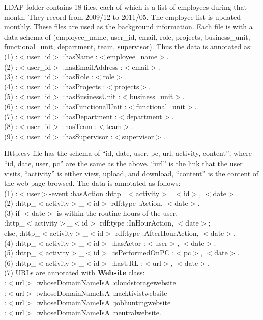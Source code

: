 LDAP folder contains 18 files, each of which is a list of employees during that month.
They record from 2009/12 to 2011/05.
The employee list is updated monthly.
These files are used as the background information. 
Each file is with a data schema of (employee\_name, user\_id, email, role, projects, business\_unit, functional\_unit, department, team, supervisor).
Thus the data is annotated as: \\
(1) :$<$user\_id$>$ :hasName :$<$employee\_name$>$. \\
(2) :$<$user\_id$>$ :hasEmailAddress :$<$email$>$. \\
(3) :$<$user\_id$>$ :hasRole :$<$role$>$. \\
(4) :$<$user\_id$>$ :hasProjects :$<$projects$>$. \\
(5) :$<$user\_id$>$ :hasBusinessUnit :$<$business\_unit$>$. \\
(6) :$<$user\_id$>$ :hasFunctionalUnit :$<$functional\_unit$>$. \\
(7) :$<$user\_id$>$ :hasDepartment :$<$department$>$. \\
(8) :$<$user\_id$>$ :hasTeam :$<$team$>$. \\
(9) :$<$user\_id$>$ :hasSupervisor :$<$supervisor$>$.

Http.csv file has the schema of ``id, date, user, pc, url, activity, content'', where ``id, date, user, pc'' are the same as the above. 
``url'' is the link that the user visits, ``activity'' is either view, upload, and download, ``content'' is the content of the web-page browsed. 
The data is annotated as follows:\\
(1) :$<$user$>$-event :hasAction :http\_$<$activity$>$\_$<$id$>$, $<$date$>$.\\
(2) :http\_$<$activity$>$\_$<$id$>$ rdf:type :Action, $<$date$>$.\\
(3) if $<$date$>$ is within the routine hours of the user, \\
:http\_$<$activity$>$\_$<$id$>$ rdf:type :InHourAction, $<$date$>$;\\
else, :http\_$<$activity$>$\_$<$id$>$ rdf:type :AfterHourAction, $<$date$>$.\\
(4) :http\_$<$activity$>$\_$<$id$>$ :hasActor :$<$user$>$, $<$date$>$.\\
(5) :http\_$<$activity$>$\_$<$id$>$ :isPerformedOnPC :$<$pc$>$, $<$date$>$.\\
(6) :http\_$<$activity$>$\_$<$id$>$ :hasURL :$<$url$>$, $<$date$>$.\\
(7) URLs are annotated with \textbf{Website} class: \\
:$<$url$>$ :whoseDomainNameIsA :cloudstoragewebsite \\
:$<$url$>$ :whoseDomainNameIsA :hacktivistwebsite \\
:$<$url$>$ :whoseDomainNameIsA :jobhuntingwebsite \\
:$<$url$>$ :whoseDomainNameIsA :neutralwebsite.
%
